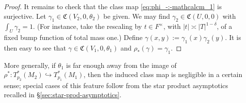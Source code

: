 \documentclass[reqno]{amsart}
\theoremstyle{plain} \newtheorem{theorem} {Theorem}
\theoremstyle{definition} \newtheorem{definition} [theorem] {Definition}
\theoremstyle{itplain} %
\numberwithin{equation}{section}
\numberwithin{theorem}{section}
\begin{document}
\begin{proof}
  It remains to check that the class map \eqref{eq:phi_-:-mathcalcm_1} is surjective.  Let $\gamma_1 \in \mathfrak{C}(V_2,0,\theta_2)$ be given.  We may find $\gamma_2 \in \mathfrak{C}(U,0,0)$ with $\int_U \gamma_2 = 1$.  (For instance, take the rescaling by $t \in F^\times$, with $|t| \asymp |T|^{1-\delta}$, of a fixed bump function of total mass one.)  Define $\gamma(x,y) := \gamma_1(x) \gamma_2(y)$.  It is then easy to see that $\gamma \in \mathfrak{C}(V_1,0,\theta_1)$ and $\rho_*(\gamma) = \gamma_1$.
\end{proof}

\begin{remark}
  More generally, if $\theta_1$ is far enough away from the image of $\rho^* : T_{p_2}^*(M_2) \hookrightarrow T_{p_1}^*(M_1)$, then the induced class map is negligible in a certain sense; special cases of this feature follow from the star product asymptotics recalled in \S\ref{sec:star-prod-asymptotics}.
\end{remark}
\end{document}
